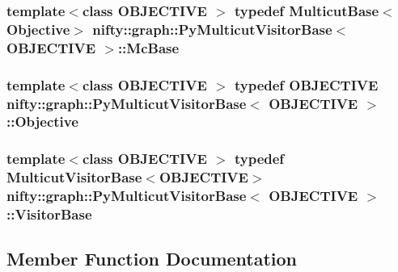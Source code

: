 \subsubsection[{Mc\+Base}]{\setlength{\rightskip}{0pt plus 5cm}template$<$class O\+B\+J\+E\+C\+T\+I\+V\+E $>$ typedef {\bf Multicut\+Base}$<${\bf Objective}$>$ {\bf nifty\+::graph\+::\+Py\+Multicut\+Visitor\+Base}$<$ O\+B\+J\+E\+C\+T\+I\+V\+E $>$\+::{\bf Mc\+Base}}\label{classnifty_1_1graph_1_1PyMulticutVisitorBase_af330023bad773111484193ae8a7bed03}
\hypertarget{classnifty_1_1graph_1_1PyMulticutVisitorBase_af9666edceae59d08a1f74b5e1c178605}{}
\subsubsection[{Objective}]{\setlength{\rightskip}{0pt plus 5cm}template$<$class O\+B\+J\+E\+C\+T\+I\+V\+E $>$ typedef O\+B\+J\+E\+C\+T\+I\+V\+E {\bf nifty\+::graph\+::\+Py\+Multicut\+Visitor\+Base}$<$ O\+B\+J\+E\+C\+T\+I\+V\+E $>$\+::{\bf Objective}}\label{classnifty_1_1graph_1_1PyMulticutVisitorBase_af9666edceae59d08a1f74b5e1c178605}
\hypertarget{classnifty_1_1graph_1_1PyMulticutVisitorBase_a5da3ad7df0fe0fafacd0386e887c90dc}{}
\subsubsection[{Visitor\+Base}]{\setlength{\rightskip}{0pt plus 5cm}template$<$class O\+B\+J\+E\+C\+T\+I\+V\+E $>$ typedef {\bf Multicut\+Visitor\+Base}$<$O\+B\+J\+E\+C\+T\+I\+V\+E$>$ {\bf nifty\+::graph\+::\+Py\+Multicut\+Visitor\+Base}$<$ O\+B\+J\+E\+C\+T\+I\+V\+E $>$\+::{\bf Visitor\+Base}}\label{classnifty_1_1graph_1_1PyMulticutVisitorBase_a5da3ad7df0fe0fafacd0386e887c90dc}


\subsection{Member Function Documentation}
\hypertarget{classnifty_1_1graph_1_1PyMulticutVisitorBase_a29e7117920077215a6bdd97c6a8824a0}{}
